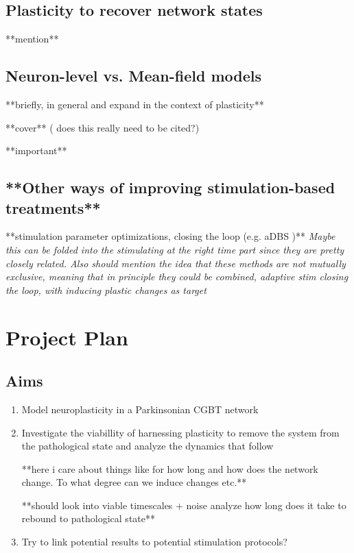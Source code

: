 \subsection{Plasticity to recover network states}
**mention** \cite{lebedev2017brain} \cite{cramer2011harnessing}

\subsection{Neuron-level vs. Mean-field models}
**briefly, in general and expand in the context of plasticity**

**cover** \cite{jansen1995electroencephalogram} (\cite{hodgkin1952measurement} does this really need to be cited?)

**important** \cite{terman2002activity} \cite{rubin2012basal} \cite{duchet2023mean} \\
\cite{shupe2021integrate} \cite{schwab2020spike}

\subsection{**Other ways of improving stimulation-based treatments**}
**stimulation parameter optimizations, closing the loop (e.g. aDBS \cite{beudel2018adaptive})**
\textit{
	Maybe this can be folded into the stimulating at the right time part
	since they are pretty closely related. Also should mention the idea that
	these methods are not mutually exclusive, meaning that in principle they
	could be combined, adaptive stim closing the loop, with inducing plastic
	changes as target
}

\section{Project Plan}


\subsection{Aims}
\begin{enumerate}
	\item Model neuroplasticity in a Parkinsonian CGBT network
	\item Investigate the viabillity of harnessing plasticity to remove the
	      system from the pathological state and analyze the dynamics that follow

	      **here i care about things like for how long and how does the network change.
	      To what degree can we induce changes etc.**

	      **should look into viable timescales + noise analyze how long does it take to rebound to
	      pathological state**
	\item Try to link potential results to potential stimulation protocols?
\end{enumerate}

